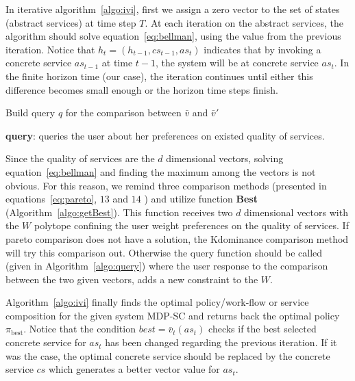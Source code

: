 \documentclass[10pt,journal,compsoc]{IEEEtran}
\begin{document}
In  iterative algorithm~\ref{algo:ivi}, first we assign a zero vector to the set of states (abstract services) at time step $T$. At each iteration on the abstract services, the algorithm should solve equation~\ref{eq:bellman}, using the value from the previous iteration. Notice that $h_t = (h_{t-1}, cs_{t-1}, as_t)$ indicates that by invoking a concrete service $as_{t-1}$ at time $t-1$, the system will be at concrete service $as_t$. %
In the finite horizon time (our case), the iteration continues until either this difference becomes small enough or the horizon time steps finish. 

\begin{algorithm}[]
Build query $q$ for the comparison between $\bar{v}$ and $\bar{v}'$ \\
\caption{\textbf{query}: queries the user about her preferences on existed quality of services.}
\end{algorithm}\label{algo:query}

Since the quality of services are the $d$ dimensional vectors, solving equation~\ref{eq:bellman} and finding the maximum among the vectors is not obvious. For this reason, we remind three comparison methods (presented in equations~\ref{eq:pareto}, $13$ and $14$ %
) and utilize function \textbf{Best} (Algorithm~\ref{algo:getBest}). This function receives two $d$ dimensional vectors with the $W$ polytope confining the user weight preferences on the quality of services. If pareto comparison does not have a solution, the Kdominance comparison method will try this comparison out. Otherwise the query function should be called (given in Algorithm~\ref{algo:query}) where the user response to the comparison between the two given vectors, adds a new constraint to the $W$. 

Algorithm~\ref{algo:ivi} finally finds the optimal policy/work-flow or service composition for the given system MDP-SC and returns back the optimal policy $\pi_{\text{best}}$. Notice that the condition $best = \bar{v}_t(as_t)$ checks if the best selected concrete service for $as_t$ has been changed regarding the previous iteration. If it was the case, the optimal concrete service should be replaced by the concrete service $cs$ which generates a better vector value for $as_t$. 
 
\end{document}
